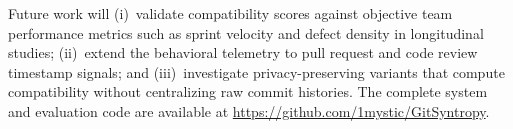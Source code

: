 \documentclass[conference]{IEEEtran}
\begin{document}
Future work will (i)~validate compatibility scores against objective
team performance metrics such as sprint velocity and defect density
in longitudinal studies; (ii)~extend the behavioral telemetry to pull
request and code review timestamp signals; and (iii)~investigate
privacy-preserving variants that compute compatibility without
centralizing raw commit histories.
The complete system and evaluation code are available at
\url{https://github.com/1mystic/GitSyntropy}.


\balance   %
\end{document}
